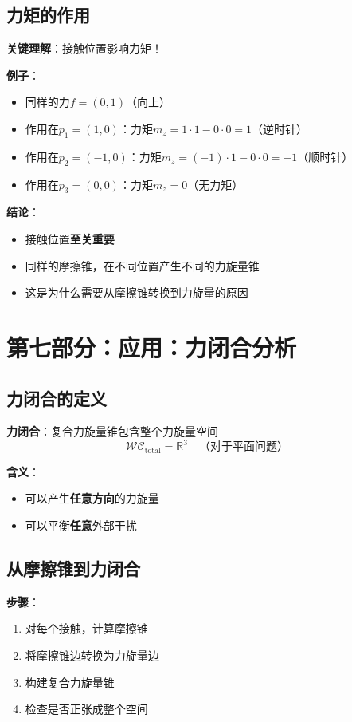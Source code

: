 \documentclass[12pt,a4paper]{article}
\begin{document}
\subsection{力矩的作用}

\textbf{关键理解}：接触位置影响力矩！

\textbf{例子}：
\begin{itemize}
\item 同样的力$f = (0, 1)$（向上）
\item 作用在$p_1 = (1, 0)$：力矩$m_z = 1 \cdot 1 - 0 \cdot 0 = 1$（逆时针）
\item 作用在$p_2 = (-1, 0)$：力矩$m_z = (-1) \cdot 1 - 0 \cdot 0 = -1$（顺时针）
\item 作用在$p_3 = (0, 0)$：力矩$m_z = 0$（无力矩）
\end{itemize}

\textbf{结论}：
\begin{itemize}
\item 接触位置\textbf{至关重要}
\item 同样的摩擦锥，在不同位置产生不同的力旋量锥
\item 这是为什么需要从摩擦锥转换到力旋量的原因
\end{itemize}

\section{第七部分：应用：力闭合分析}

\subsection{力闭合的定义}

\textbf{力闭合}：复合力旋量锥包含整个力旋量空间
\begin{equation}
\mathcal{WC}_{\text{total}} = \mathbb{R}^3 \quad \text{（对于平面问题）}
\end{equation}

\textbf{含义}：
\begin{itemize}
\item 可以产生\textbf{任意方向}的力旋量
\item 可以平衡\textbf{任意}外部干扰
\end{itemize}

\subsection{从摩擦锥到力闭合}

\textbf{步骤}：
\begin{enumerate}
\item 对每个接触，计算摩擦锥
\item 将摩擦锥边转换为力旋量边
\item 构建复合力旋量锥
\item 检查是否正张成整个空间
\end{enumerate}
\end{document}
